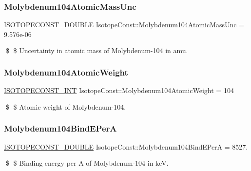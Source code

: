 \subsubsection{\texorpdfstring{Molybdenum104\+Atomic\+Mass\+Unc}{Molybdenum104AtomicMassUnc}}
{\footnotesize\ttfamily \mbox{\hyperlink{group___isotope_const-_macros_ga8f45a7272ce02c0b4c65c44636ed719a}{I\+S\+O\+T\+O\+P\+E\+C\+O\+N\+S\+T\+\_\+\+D\+O\+U\+B\+LE}} Isotope\+Const\+::\+Molybdenum104\+Atomic\+Mass\+Unc = 9.\+576e-\/06}

\$ \$ Uncertainty in atomic mass of Molybdenum-\/104 in amu. \mbox{\label{group___isotope_const-_molybdenum-_mo104_gac373402e703a22856ce6ccd14fba92aa}} 
\subsubsection{\texorpdfstring{Molybdenum104\+Atomic\+Weight}{Molybdenum104AtomicWeight}}
{\footnotesize\ttfamily \mbox{\hyperlink{group___isotope_const-_macros_ga5f18360b3e99483a35c32d789e62621c}{I\+S\+O\+T\+O\+P\+E\+C\+O\+N\+S\+T\+\_\+\+I\+NT}} Isotope\+Const\+::\+Molybdenum104\+Atomic\+Weight = 104}

\$ \$ Atomic weight of Molybdenum-\/104. \mbox{\label{group___isotope_const-_molybdenum-_mo104_ga603f32c6a17cdb227463ce6b7153777d}} 
\subsubsection{\texorpdfstring{Molybdenum104\+Bind\+E\+PerA}{Molybdenum104BindEPerA}}
{\footnotesize\ttfamily \mbox{\hyperlink{group___isotope_const-_macros_ga8f45a7272ce02c0b4c65c44636ed719a}{I\+S\+O\+T\+O\+P\+E\+C\+O\+N\+S\+T\+\_\+\+D\+O\+U\+B\+LE}} Isotope\+Const\+::\+Molybdenum104\+Bind\+E\+PerA = 8527.}

\$ \$ Binding energy per A of Molybdenum-\/104 in keV. \mbox{\label{group___isotope_const-_molybdenum-_mo104_gaa620345e8630ad8a351e77d901349d23}} 

